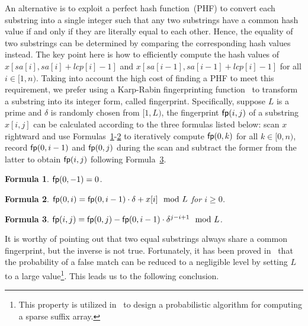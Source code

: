 \documentclass[10pt,journal,compsoc]{IEEEtran}
\newtheorem{Formula}{Formula}
\begin{document}
An alternative is to exploit a perfect hash function~(PHF) to convert each substring into a single integer such that any two substrings have a common hash value if and only if they are literally equal to each other. Hence, the equality of two substrings can be determined by comparing the corresponding hash values instead. The key point here is how to efficiently compute the hash values of $x[sa[i], sa[i] + lcp[i] - 1]$ and $x[sa[i - 1], sa[i - 1] + lcp[i] - 1]$ for all $i \in [1, n)$. Taking into account the high cost of finding a PHF to meet this requirement, we prefer using a Karp-Rabin fingerprinting function~\cite{Karp1987} to transform a substring into its integer form, called fingerprint. Specifically, suppose $L$ is a prime and $\delta$ is randomly chosen from $[1, L)$, the fingerprint ${\sf fp}(i, j)$ of a substring $x[i, j]$ can be calculated according to the three formulas listed below: scan $x$ rightward and use Formulas~\ref{formula:1}-\ref{formula:2} to iteratively compute ${\sf fp}(0, k)$ for all $k \in [0, n)$, record ${\sf fp}(0, i - 1)$ and ${\sf fp}(0, j)$ during the scan and subtract the former from the latter to obtain ${\sf fp}(i, j)$ following Formula~\ref{formula:3}. 

\begin{Formula} \label{formula:1}
	${\sf fp}(0, -1) = 0$.
	
\end{Formula}

\begin{Formula} \label{formula:2}	
	${\sf fp}(0, i) = {\sf fp}(0, i - 1) \cdot {\delta} + x[i]\mod L$ for $i \ge 0$.
	
\end{Formula}

\begin{Formula} \label{formula:3}
	${\sf fp}(i, j) = {\sf fp}(0, j) - {\sf fp}(0 ,i - 1) \cdot {\delta}^{j - i + 1}\mod L$.
	
\end{Formula}

It is worthy of pointing out that two equal substrings always share a common fingerprint, but the inverse is not true. Fortunately, it has been proved in~\cite{Karp1987} that the probability of a false match can be reduced to a negligible level by setting $L$ to a large value\footnote{This property is utilized in~\cite{Bille2013} to design a probabilistic algorithm for computing a sparse suffix array. }. This leads us to the following conclusion.
\end{document}
